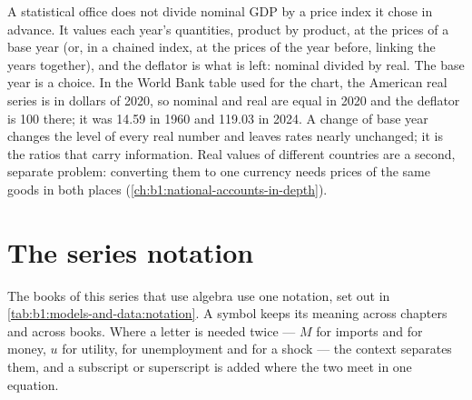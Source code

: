 \begin{measure}
A statistical office does not divide nominal GDP by a price index it chose
in advance. It values each year's quantities, product by product, at the
prices of a base year (or, in a chained index, at the prices of the year
before, linking the years together), and the deflator is what is left:
nominal divided by real. The base year is a choice. In the World Bank table
used for the chart, the American real series is in dollars of 2020, so
nominal and real are equal in 2020 and the deflator is 100 there; it was
14.59 in 1960 and 119.03 in 2024. %
A change of base year changes the level of every real number and leaves
 rates nearly unchanged; it is the ratios that carry
information. Real values of different countries are a second, separate
problem: converting them to one currency needs prices of the same goods in
both places (\cref{ch:b1:national-accounts-in-depth}).
\end{measure}

\section{The series notation}\label{sec:b1:models-and-data:notation}

The books of this series that use algebra use one notation, set out in
\cref{tab:b1:models-and-data:notation}. A symbol keeps its meaning across
chapters and across books. Where a letter is needed twice --- $M$ for
imports and for money, $u$ for utility, for unemployment and for a shock ---
the context separates them, and a subscript or superscript is added where
the two meet in one equation.


